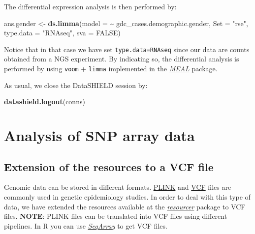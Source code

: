\documentclass[]{article}
\newenvironment{Shaded}{\begin{snugshade}}{\end{snugshade}}
\newcommand{\DataTypeTok}[1]{\textcolor[rgb]{0.13,0.29,0.53}{#1}}
\newcommand{\KeywordTok}[1]{\textcolor[rgb]{0.13,0.29,0.53}{\textbf{#1}}}
\newcommand{\NormalTok}[1]{#1}
\newcommand{\OperatorTok}[1]{\textcolor[rgb]{0.81,0.36,0.00}{\textbf{#1}}}
\newcommand{\OtherTok}[1]{\textcolor[rgb]{0.56,0.35,0.01}{#1}}
\newcommand{\StringTok}[1]{\textcolor[rgb]{0.31,0.60,0.02}{#1}}
\begin{document}
The differential expression analysis is then performed by:

\begin{Shaded}
\begin{Highlighting}[]
\NormalTok{ans.gender <{-}}\StringTok{ }\KeywordTok{ds.limma}\NormalTok{(}\DataTypeTok{model =}  \OperatorTok{\textasciitilde{}}\StringTok{ }\NormalTok{gdc\_cases.demographic.gender, }
                   \DataTypeTok{Set =} \StringTok{"rse"}\NormalTok{, }\DataTypeTok{type.data =} \StringTok{"RNAseq"}\NormalTok{, }
                   \DataTypeTok{sva =} \OtherTok{FALSE}\NormalTok{)}
\end{Highlighting}
\end{Shaded}

Notice that in that case we have set
\texttt{type.data=\textquotesingle{}RNAseq\textquotesingle{}} since our
data are counts obtained from a NGS experiment. By indicating so, the
differential analysis is performed by using \texttt{voom} +
\texttt{limma} implemented in the
\emph{\href{https://bioconductor.org/packages/3.9/MEAL}{MEAL}} package.

As usual, we close the DataSHIELD session by:

\begin{Shaded}
\begin{Highlighting}[]
\KeywordTok{datashield.logout}\NormalTok{(conns)}
\end{Highlighting}
\end{Shaded}

\hypertarget{analysis-of-snp-array-data}{%
\section{Analysis of SNP array data}\label{analysis-of-snp-array-data}}

\hypertarget{extension-of-the-resources-to-a-vcf-file}{%
\subsection{Extension of the resources to a VCF
file}\label{extension-of-the-resources-to-a-vcf-file}}

Genomic data can be stored in different formats.
\href{http://zzz.bwh.harvard.edu/plink/}{PLINK} and
\href{https://www.internationalgenome.org/wiki/Analysis/vcf4.0/}{VCF}
files are commonly used in genetic epidemiology studies. In order to
deal with this type of data, we have extended the resources available at
the \emph{\href{https://github.com/obiba}{resourcer}} package to VCF
files. \textbf{NOTE}: PLINK files can be translated into VCF files using
different pipelines. In R you can use
\emph{\href{https://bioconductor.org/packages/3.9/SeqArray}{SeqArray}}
to get VCF files.
\end{document}
